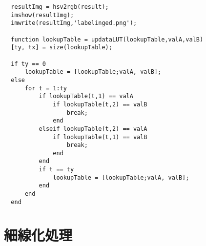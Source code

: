 \documentclass[a4j]{jarticle}
\begin{document}
\begin{verbatim}
  resultImg = hsv2rgb(result);
  imshow(resultImg);
  imwrite(resultImg,'labelinged.png');

  function lookupTable = updataLUT(lookupTable,valA,valB)
  [ty, tx] = size(lookupTable);

  if ty == 0
      lookupTable = [lookupTable;valA, valB];
  else
      for t = 1:ty
          if lookupTable(t,1) == valA
              if lookupTable(t,2) == valB
                  break;
              end
          elseif lookupTable(t,2) == valA
              if lookupTable(t,1) == valB
                  break;
              end
          end
          if t == ty
              lookupTable = [lookupTable;valA, valB];
          end
      end
  end
\end{verbatim}

\section{細線化処理}
\end{document}

